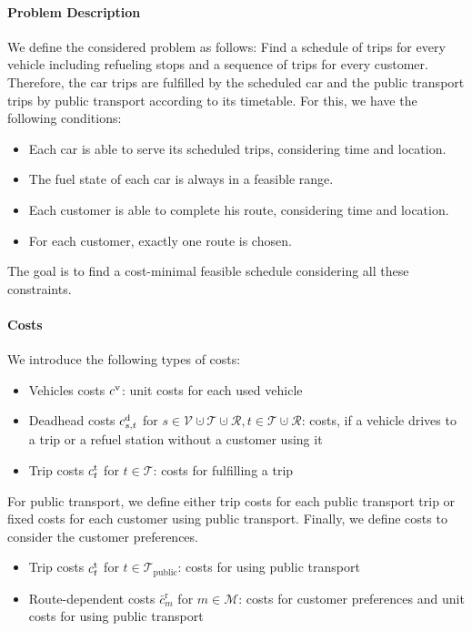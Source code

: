 \paragraph{Problem Description} \parfill

We define the considered problem as follows: Find a schedule of trips for every vehicle including refueling stops and a sequence of trips for every customer. Therefore, the car trips are fulfilled by the scheduled car and the public transport trips by public transport according to its timetable. For this, we have the following conditions:

\begin{itemize}
	\item{Each car is able to serve its scheduled trips, considering time and location.}
	\item{The fuel state of each car is always in a feasible range.}
	\item{Each customer is able to complete his route, considering time and location.}
	\item{For each customer, exactly one route is chosen.}
\end{itemize}

The goal is to find a cost-minimal feasible schedule considering all these constraints.

\paragraph{Costs} \parfill

We introduce the following types of costs:
\begin{itemize}
	\item{Vehicles costs $c^{\operatorname{v}}$: unit costs for each used vehicle}
	\item{Deadhead costs $c^{\operatorname{d}}_{s,t}$ for $s\in\mathcal{V}\cupdot\mathcal{T}\cupdot\mathcal{R}, t\in\mathcal{T}\cupdot\mathcal{R}$: costs, if a vehicle drives to a trip or a refuel station without a customer using it}
	\item{Trip costs $c^{\operatorname{t}}_t$ for $t\in\mathcal{T}$: costs for fulfilling a trip}
\end{itemize}

For public transport, we define either trip costs for each public transport trip or fixed costs for each customer using public transport. Finally, we define costs to consider the customer preferences.
\begin{itemize}
	\item{Trip costs $c^{\operatorname{t}}_t$ for $t\in\mathcal{T}_{\operatorname{public}}$: costs for using public transport}
	\item{Route-dependent costs $\bar{c}^{\operatorname{r}}_m$ for $m\in\mathcal{M}$: costs for customer preferences and unit costs for using public transport}
\end{itemize}


